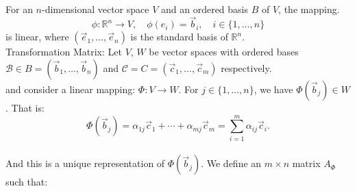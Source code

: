 \documentclass[12pt]{article}
\begin{document}
\begin{center}
\end{center}
\\
\newline
{For an $n$-dimensional vector space $V$ and an ordered basis $B$ of $V$, the mapping.}
$$
\phi: \mathbb{R}^n \to V, \quad \phi(e_i) = \vec{b}_i, \quad i \in \{1, \ldots, n\}
$$
is linear, where $(\vec{e}_1, \ldots, \vec{e}_n)$ is the standard basis of $\mathbb{R}^n$.
\\
\newline
{Transformation Matrix:} Let $V$, $W$ be vector spaces with ordered bases $\mathcal{B} \in B = (\vec{b}_1, \ldots, \vec{b}_n)$ and $\mathcal{C} = C = (\vec{c}_1, \ldots, \vec{c}_m)$ respectively.
\\
and consider a linear mapping:
$
\Phi : V \longrightarrow W.
$
For $j \in \{1, \ldots, n\}$, we have $\Phi(\vec{b}_j) \in W$. That is:
$$
\Phi(\vec{b}_j) = \alpha_{1j} \vec{c}_1 + \cdots + \alpha_{mj} \vec{c}_m = \sum_{i=1}^{m} \alpha_{ij} \vec{c}_i.
$$
\\
\newline
And this is a unique representation of $\Phi(\vec{b}_j)$. We define an $m \times n$ matrix $A_\Phi$ such that:
\end{document}
